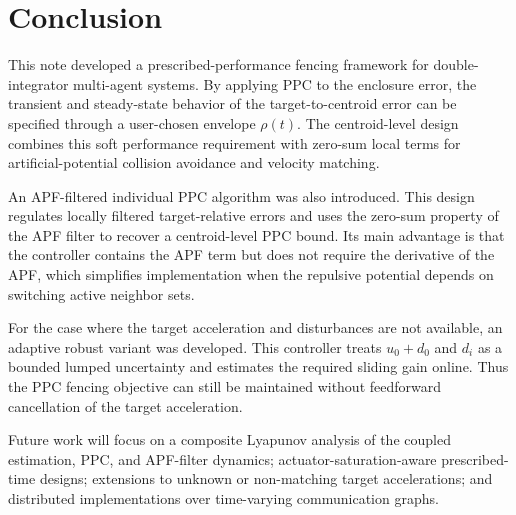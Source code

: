\section{Conclusion}
\label{sec:conclusion}

This note developed a prescribed-performance fencing framework for
double-integrator multi-agent systems.  By applying PPC to the enclosure
error, the transient and steady-state behavior of the target-to-centroid
error can be specified through a user-chosen envelope $\rho(t)$.  The
centroid-level design combines this soft performance requirement with
zero-sum local terms for artificial-potential collision avoidance and
velocity matching.

An APF-filtered individual PPC algorithm was also introduced.  This design
regulates locally filtered target-relative errors and uses the zero-sum
property of the APF filter to recover a centroid-level PPC bound.  Its main
advantage is that the controller contains the APF term but does not require
the derivative of the APF, which simplifies implementation when the
repulsive potential depends on switching active neighbor sets.

For the case where the target acceleration and disturbances are not
available, an adaptive robust variant was developed.  This controller treats
$u_0+d_0$ and $d_i$ as a bounded lumped uncertainty and estimates the
required sliding gain online.  Thus the PPC fencing objective can still be
maintained without feedforward cancellation of the target acceleration.

Future work will focus on a composite Lyapunov analysis of the coupled
estimation, PPC, and APF-filter dynamics; actuator-saturation-aware
prescribed-time designs; extensions to unknown or non-matching target
accelerations; and distributed implementations over time-varying
communication graphs.
